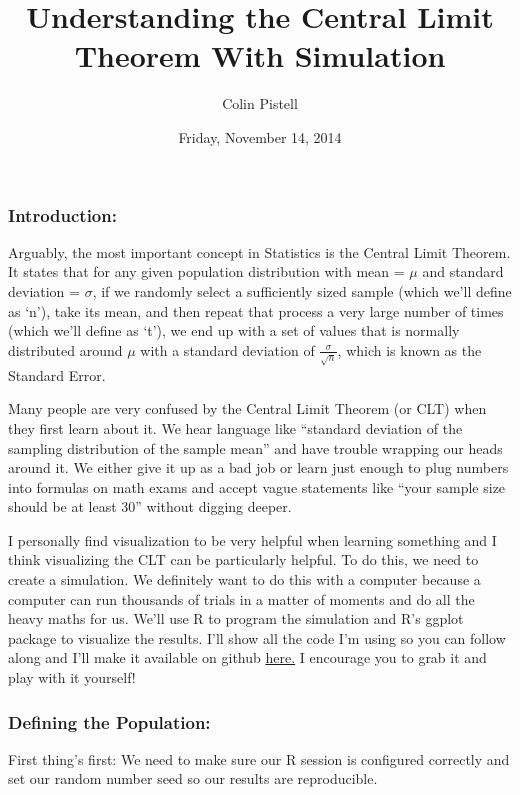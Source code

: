 \documentclass[]{article}
\title{Understanding the Central Limit Theorem With Simulation}
\author{Colin Pistell}
\date{Friday, November 14, 2014}
\begin{document}
\maketitle


\subsubsection{Introduction:}\label{introduction}

Arguably, the most important concept in Statistics is the Central Limit
Theorem. It states that for any given population distribution with mean
= $\mu$ and standard deviation = $\sigma$, if we randomly select a
sufficiently sized sample (which we'll define as `n'), take its mean,
and then repeat that process a very large number of times (which we'll
define as `t'), we end up with a set of values that is normally
distributed around $\mu$ with a standard deviation of
$\frac{\sigma}{\sqrt{n}}$, which is known as the Standard Error.

Many people are very confused by the Central Limit Theorem (or CLT) when
they first learn about it. We hear language like ``standard deviation of
the sampling distribution of the sample mean'' and have trouble wrapping
our heads around it. We either give it up as a bad job or learn just
enough to plug numbers into formulas on math exams and accept vague
statements like ``your sample size should be at least 30'' without
digging deeper.

I personally find visualization to be very helpful when learning
something and I think visualizing the CLT can be particularly helpful.
To do this, we need to create a simulation. We definitely want to do
this with a computer because a computer can run thousands of trials in a
matter of moments and do all the heavy maths for us. We'll use R to
program the simulation and R's ggplot package to visualize the results.
I'll show all the code I'm using so you can follow along and I'll make
it available on github
\href{https://github.com/JCPistell/CLT-Simulation}{here.} I encourage
you to grab it and play with it yourself!

\subsubsection{Defining the Population:}\label{defining-the-population}

First thing's first: We need to make sure our R session is configured
correctly and set our random number seed so our results are
reproducible.
\end{document}
